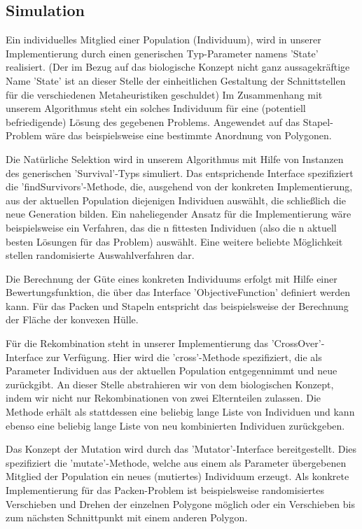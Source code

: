 \documentclass[runningheads,a4paper]{llncs}
\begin{document}
\subsection{Simulation}

Ein individuelles Mitglied einer Population (Individuum), wird in unserer Implementierung durch einen generischen Typ-Parameter namens 'State' realisiert. (Der im Bezug auf das biologische Konzept nicht ganz aussagekräftige Name 'State' ist an dieser Stelle der einheitlichen Gestaltung der Schnittstellen für die verschiedenen Metaheuristiken geschuldet) Im Zusammenhang mit unserem Algorithmus steht ein solches Individuum für eine (potentiell befriedigende) Lösung des gegebenen Problems. Angewendet auf das Stapel-Problem wäre das beispielsweise eine bestimmte Anordnung von Polygonen.

Die Natürliche Selektion wird in unserem Algorithmus mit Hilfe von Instanzen des generischen 'Survival'-Typs simuliert. Das entsprichende Interface spezifiziert die 'findSurvivors'-Methode, die, ausgehend von der konkreten Implementierung, aus der aktuellen Population diejenigen Individuen auswählt, die schließlich die neue Generation bilden. Ein naheliegender Ansatz für die Implementierung wäre beispielsweise ein Verfahren, das die n fittesten Individuen (also die n aktuell besten Lösungen für das Problem) auswählt. Eine weitere beliebte Möglichkeit stellen randomisierte Auswahlverfahren dar.

Die Berechnung der Güte eines konkreten Individuums erfolgt mit Hilfe einer Bewertungsfunktion, die über das Interface 'ObjectiveFunction' definiert werden kann. Für das Packen und Stapeln entspricht das beispielsweise der Berechnung der Fläche der konvexen Hülle.

Für die Rekombination steht in unserer Implementierung das 'CrossOver'-Interface zur Verfügung. Hier wird die 'cross'-Methode spezifiziert, die als Parameter Individuen aus der aktuellen Population entgegennimmt und neue zurückgibt. An dieser Stelle abstrahieren wir von dem biologischen Konzept, indem wir nicht nur Rekombinationen von zwei Elternteilen zulassen. Die Methode erhält als stattdessen eine beliebig lange Liste von Individuen und kann ebenso eine beliebig lange Liste von neu kombinierten Individuen zurückgeben.     

Das Konzept der Mutation wird durch das 'Mutator'-Interface bereitgestellt. Dies spezifiziert die 'mutate'-Methode, welche aus einem als Parameter übergebenen Mitglied der Population ein neues (mutiertes) Individuum erzeugt. Als konkrete Implementierung für das Packen-Problem ist beispielsweise randomisiertes Verschieben und Drehen der einzelnen Polygone möglich oder ein Verschieben bis zum nächsten Schnittpunkt mit einem anderen Polygon.
\end{document}
